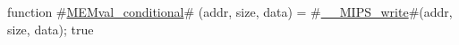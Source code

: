 function #\hyperref[zMEMvalzyconditional]{MEMval\_conditional}# (addr, size, data) = { #\hyperref[zzyzyMIPSzywrite]{\_\_MIPS\_write}#(addr, size, data); true }
